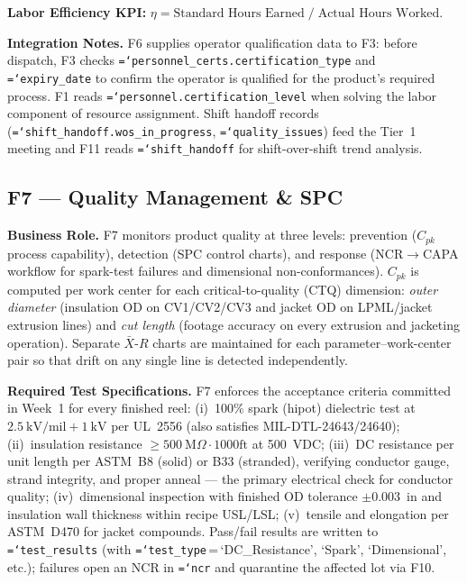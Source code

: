 \documentclass[11pt]{article}
\newcommand{\tfield}[1]{\texttt{\hyphenchar\font=`\-\relax #1}}
\begin{document}
\textbf{Labor Efficiency KPI:} $\eta = \text{Standard Hours Earned} \;/\; \text{Actual Hours Worked}$.

\textbf{Integration Notes.}
F6 supplies operator qualification data to F3: before dispatch, F3 checks \tfield{personnel\_certs.certification\_type} and \tfield{expiry\_date} to confirm the operator is qualified for the product's required process.  F1 reads \tfield{personnel.certification\_level} when solving the labor component of resource assignment.  Shift handoff records (\tfield{shift\_handoff.wos\_in\_progress}, \tfield{quality\_issues}) feed the Tier~1 meeting and F11 reads \tfield{shift\_handoff} for shift-over-shift trend analysis.

\subsection{F7 --- Quality Management \& SPC}

\textbf{Business Role.}
F7 monitors product quality at three levels: prevention ($C_{pk}$ process capability), detection (SPC control charts), and response (NCR$\to$CAPA workflow for spark-test failures and dimensional non-conformances).  $C_{pk}$ is computed per work center for each critical-to-quality (CTQ) dimension: \emph{outer diameter} (insulation OD on CV1/CV2/CV3 and jacket OD on LPML/jacket extrusion lines) and \emph{cut length} (footage accuracy on every extrusion and jacketing operation).  Separate $\bar{X}$-$R$ charts are maintained for each parameter--work-center pair so that drift on any single line is detected independently.

\textbf{Required Test Specifications.}  F7 enforces the acceptance criteria committed in Week~1 for every finished reel: (i)~100\% spark (hipot) dielectric test at $2.5~\text{kV/mil} + 1~\text{kV}$ per UL~2556 (also satisfies MIL-DTL-24643/24640); (ii)~insulation resistance $\geq 500~\text{M}\Omega\cdot1000\text{ft}$ at 500~VDC; (iii)~DC resistance per unit length per ASTM~B8 (solid) or B33 (stranded), verifying conductor gauge, strand integrity, and proper anneal --- the primary electrical check for conductor quality; (iv)~dimensional inspection with finished OD tolerance $\pm 0.003$~in and insulation wall thickness within recipe USL/LSL; (v)~tensile and elongation per ASTM~D470 for jacket compounds.  Pass/fail results are written to \tfield{test\_results} (with \tfield{test\_type}\,=\,`DC\_Resistance', `Spark', `Dimensional', etc.); failures open an NCR in \tfield{ncr} and quarantine the affected lot via F10.
\end{document}
